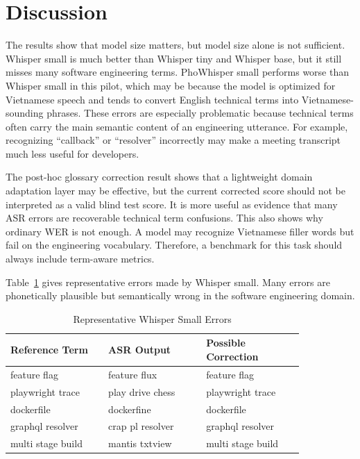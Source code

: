\documentclass[conference]{IEEEtran}
\begin{document}
\section{Discussion}
The results show that model size matters, but model size alone is not sufficient. Whisper small is much better than Whisper tiny and Whisper base, but it still misses many software engineering terms. PhoWhisper small performs worse than Whisper small in this pilot, which may be because the model is optimized for Vietnamese speech and tends to convert English technical terms into Vietnamese-sounding phrases. These errors are especially problematic because technical terms often carry the main semantic content of an engineering utterance. For example, recognizing ``callback'' or ``resolver'' incorrectly may make a meeting transcript much less useful for developers.

The post-hoc glossary correction result shows that a lightweight domain adaptation layer may be effective, but the current corrected score should not be interpreted as a valid blind test score. It is more useful as evidence that many ASR errors are recoverable technical term confusions. This also shows why ordinary WER is not enough. A model may recognize Vietnamese filler words but fail on the engineering vocabulary. Therefore, a benchmark for this task should always include term-aware metrics.

Table~\ref{tab:qualitative} gives representative errors made by Whisper small. Many errors are phonetically plausible but semantically wrong in the software engineering domain.

\begin{table}[htbp]
\caption{Representative Whisper Small Errors}
\begin{center}
\begin{tabular}{p{0.28\linewidth}p{0.28\linewidth}p{0.28\linewidth}}
\toprule
\textbf{Reference Term} & \textbf{ASR Output} & \textbf{Possible Correction} \\
\midrule
feature flag & feature flux & feature flag \\
playwright trace & play drive chess & playwright trace \\
dockerfile & dockerfine & dockerfile \\
graphql resolver & crap pl resolver & graphql resolver \\
multi stage build & mantis txtview & multi stage build \\
\bottomrule
\end{tabular}
\label{tab:qualitative}
\end{center}
\end{table}
\end{document}
